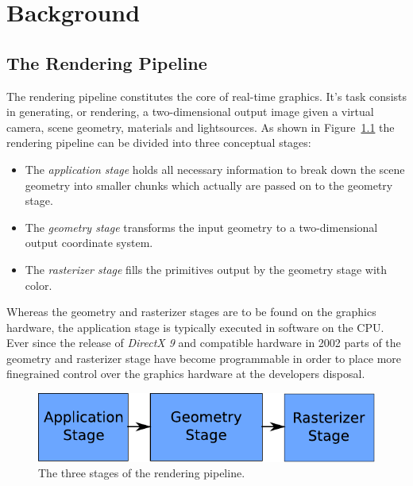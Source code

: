 \chapter{Background}
\label{Background}

%
%
%
%

\section{The Rendering Pipeline}
\label{RenderingPipelineS}
The rendering pipeline constitutes the core of real-time graphics. It's task
consists in generating, or rendering, a two-dimensional output image given a
virtual camera, scene geometry, materials and
lightsources\cite{book:akenine-rtr}. As shown in Figure~\ref{fig:RAGR} the
rendering pipeline can be divided into three conceptual stages:
\begin{itemize}
 \item The \textit{application stage} holds all necessary information to break
down the scene geometry into smaller chunks which actually are passed on to the
geometry stage.
 \item The \textit{geometry stage} transforms the input geometry to a
two-dimensional output coordinate system.
 \item The \textit{rasterizer stage} fills the primitives output by the
geometry stage with color.
\end{itemize}
Whereas the geometry and rasterizer stages are to be found on the graphics
hardware, the application stage is typically executed in software on the CPU.
Ever since the release of \textit{DirectX 9} and compatible hardware in 2002
parts of the geometry and rasterizer stage have become programmable in order
to place more finegrained control over the graphics hardware at the developers
disposal.
\begin{figure}
\begin{center}
\includegraphics[scale=0.8]{Images/Rendering-Pipeline-AGR.pdf}
\caption{The three stages of the rendering pipeline.}
\label{fig:RAGR}
\end{center}
\end{figure}

